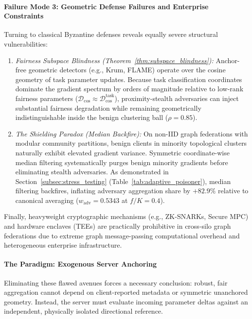\paragraph{Failure Mode 3: Geometric Defense Failures and Enterprise Constraints}
Turning to classical Byzantine defenses reveals equally severe structural vulnerabilities:
\begin{enumerate}[leftmargin=*]
    \item \emph{Fairness Subspace Blindness (Theorem~\ref{thm:subspace_blindness}):} Anchor-free geometric detectors (e.g., Krum, FLAME) operate over the cosine geometry of task parameter updates. Because task classification coordinates dominate the gradient spectrum by orders of magnitude relative to low-rank fairness parameters ($\mathcal{D}_{\mathrm{cos}} \approx \mathcal{D}_{\mathrm{cos}}^{\mathrm{task}}$), proximity-stealth adversaries can inject substantial fairness degradation while remaining geometrically indistinguishable inside the benign clustering ball ($\rho = 0.85$).
    \item \emph{The Shielding Paradox (Median Backfire):} On non-IID graph federations with modular community partitions, benign clients in minority topological clusters naturally exhibit elevated gradient variance. Symmetric coordinate-wise median filtering systematically purges benign minority gradients before eliminating stealth adversaries. As demonstrated in Section~\ref{subsec:stress_testing} (Table~\ref{tab:adaptive_poisoner}), median filtering backfires, inflating adversary aggregation share by $+82.9\%$ relative to canonical averaging ($w_{\mathrm{adv}} = 0.5343$ at $f/K=0.4$).
\end{enumerate}
Finally, heavyweight cryptographic mechanisms (e.g., ZK-SNARKs, Secure MPC) and hardware enclaves (TEEs) are practically prohibitive in cross-silo graph federations due to extreme graph message-passing computational overhead and heterogeneous enterprise infrastructure.

\paragraph{The \MethodName{} Paradigm: Exogenous Server Anchoring}
Eliminating these flawed avenues forces a necessary conclusion: robust, fair aggregation cannot depend on client-reported metadata or symmetric unanchored geometry. Instead, the server must evaluate incoming parameter deltas against an independent, physically isolated directional reference. 

